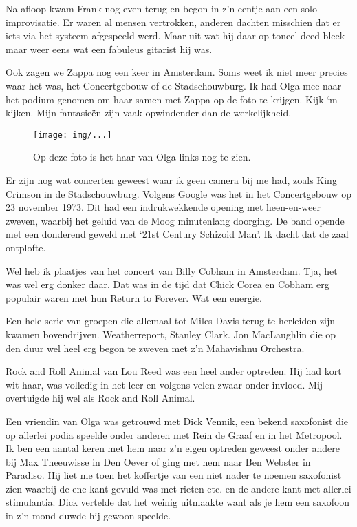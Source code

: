 \documentclass[10pt,twoside,openright]{memoir}
\begin{document}
Na afloop kwam Frank nog even terug en begon in z’n eentje aan een solo-improvisatie. Er waren al mensen vertrokken, anderen dachten misschien dat er iets via het systeem afgespeeld werd. Maar uit wat hij daar op toneel deed bleek maar weer eens wat een fabuleus gitarist hij was.

Ook zagen we Zappa nog een keer in Amsterdam. Soms weet ik niet meer precies waar het was, het Concertgebouw of de Stadschouwburg. Ik had Olga mee naar het podium genomen om haar samen met Zappa op de foto te krijgen. Kijk ‘m kijken. Mijn fantasieën zijn vaak opwindender dan de werkelijkheid.

\begin{figure}[t]
\texttt{[image: img/...]}
\caption{Op deze foto is het haar van Olga links nog te zien.}
\end{figure}

Er zijn nog wat concerten geweest waar ik geen camera bij me had, zoals King Crimson in de Stadschouwburg. Volgens Google was het in het Concertgebouw op 23 november 1973. Dit had een indrukwekkende opening met heen-en-weer zweven, waarbij het geluid van de Moog minutenlang doorging. De band opende met een donderend geweld met `21st Century Schizoid Man'. Ik dacht dat de zaal ontplofte.

Wel heb ik plaatjes van het concert van Billy Cobham in Amsterdam. Tja, het was wel erg donker daar. Dat was in de tijd dat Chick Corea en Cobham erg populair waren met hun Return to Forever. Wat een energie. 

Een hele serie van groepen die allemaal tot Miles Davis terug te herleiden zijn kwamen bovendrijven. Weatherreport, Stanley Clark. Jon MacLaughlin die op den duur wel heel erg begon te zweven met z’n Mahavishnu Orchestra.

Rock and Roll Animal van Lou Reed was een heel ander optreden. Hij had kort wit haar, was volledig in het leer en volgens velen zwaar onder invloed. Mij overtuigde hij wel als Rock and Roll Animal.

Een vriendin van Olga was getrouwd met Dick Vennik, een bekend saxofonist die op allerlei podia speelde onder anderen met Rein de Graaf en in het Metropool. Ik ben een aantal keren met hem naar z’n eigen optreden geweest onder andere bij Max Theeuwisse in Den Oever of ging met hem naar Ben Webster in Paradiso. Hij liet me toen het koffertje van een niet nader te noemen saxofonist zien waarbij de ene kant gevuld was met rieten etc. en de andere kant met allerlei stimulantia. Dick vertelde dat het weinig uitmaakte want als je hem een saxofoon in z’n mond duwde hij gewoon speelde.
\end{document}
